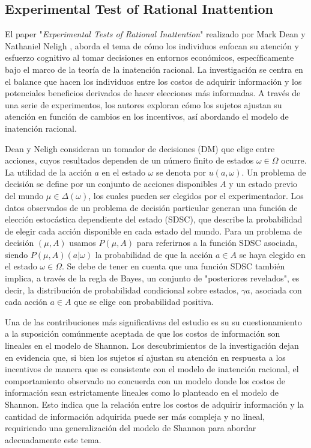 \subsection{Experimental Test of Rational Inattention}
El paper "\textit{Experimental Tests of Rational Inattention}" realizado por Mark Dean y Nathaniel Neligh \cite{dean_experimental_2023}, aborda el tema de cómo los individuos enfocan su atención y esfuerzo cognitivo al tomar decisiones en entornos económicos, específicamente bajo el marco de la teoría de la inatención racional. La investigación se centra en el balance que hacen los individuos entre los costos de adquirir información y los potenciales beneficios derivados de hacer elecciones más informadas. A través de una serie de experimentos, los autores exploran cómo los sujetos ajustan su atención en función de cambios en los incentivos, así abordando el modelo de inatención racional.

Dean y Neligh consideran un tomador de decisiones (DM) que elige entre acciones, cuyos resultados dependen de un número finito de estados $\omega \in \Omega$ ocurre. La utilidad de la acción $a$ en el estado $\omega$ se denota por $u(a, \omega)$. Un problema de decisión se define por un conjunto de acciones disponibles $A$ y un estado previo del mundo $\mu \in \Delta(\omega)$, los cuales pueden ser elegidos por el experimentador. Los datos observados de un problema de decisión particular generan una función de elección estocástica dependiente del estado (SDSC), que describe la probabilidad de elegir cada acción disponible en cada estado del mundo. Para un problema de decisión $(\mu, A)$ usamos $P(\mu,A)$ para referirnos a la función SDSC asociada, siendo $P(\mu,A)(a|\omega)$ la probabilidad de que la acción $a \in A$ se haya elegido en el estado $\omega \in \Omega$. Se debe de tener en cuenta que una función SDSC también implica, a través de la regla de Bayes, un conjunto de "posteriores revelados", es decir, la distribución de probabilidad condicional sobre estados, $\gamma a$, asociada con cada acción $a \in A$ que se elige con probabilidad positiva.

Una de las contribuciones más significativas del estudio es su su cuestionamiento a la suposición comúnmente aceptada de que los costos de información son lineales en el modelo de Shannon. Los descubrimientos de la investigación dejan en evidencia que, si bien los sujetos sí ajustan su atención en respuesta a los incentivos de manera que es consistente con el modelo de inatención racional, el comportamiento observado no concuerda con un modelo donde los costos de información sean estrictamente lineales como lo planteado en el modelo de Shannon. Esto indica que la relación entre los costos de adquirir información y la cantidad de información adquirida puede ser más compleja y no lineal, requiriendo una generalización del modelo de Shannon para abordar adecuadamente este tema.

